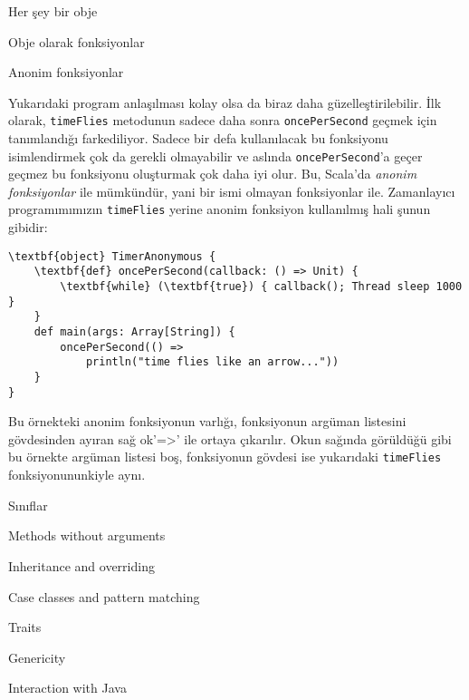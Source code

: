 \documentclass[10pt,a4paper]{book}
\begin{document}
\begin{chapter}{Her şey bir obje}
\begin{section}{Obje olarak fonksiyonlar}
\begin{subsection}{Anonim fonksiyonlar}

Yukarıdaki program anlaşılması kolay olsa da biraz daha güzelleştirilebilir. İlk olarak, \texttt{timeFlies} metodunun sadece daha sonra \texttt{oncePerSecond} geçmek için tanımlandığı farkediliyor. Sadece bir defa kullanılacak bu fonksiyonu isimlendirmek çok da gerekli olmayabilir ve aslında \texttt{oncePerSecond}'a geçer geçmez bu fonksiyonu oluşturmak çok daha iyi olur. Bu, Scala'da \textit{anonim fonksiyonlar} ile mümkündür, yani bir ismi olmayan fonksiyonlar ile. Zamanlayıcı programımımızın \texttt{timeFlies} yerine anonim fonksiyon kullanılmış hali şunun gibidir:

\begin{verbatim}
\textbf{object} TimerAnonymous {
	\textbf{def} oncePerSecond(callback: () => Unit) {
		\textbf{while} (\textbf{true}) { callback(); Thread sleep 1000 }
	}
	def main(args: Array[String]) {
		oncePerSecond(() =>
			println("time flies like an arrow..."))
	}
}
\end{verbatim}

Bu örnekteki anonim fonksiyonun varlığı, fonksiyonun argüman listesini gövdesinden ayıran sağ ok'=>' ile ortaya çıkarılır. Okun sağında görüldüğü gibi bu örnekte argüman listesi boş, fonksiyonun gövdesi ise yukarıdaki \texttt{timeFlies} fonksiyonununkiyle aynı.
\end{subsection}

\end{section}

\end{chapter}

\begin{chapter}{Sınıflar}

\begin{section}{Methods without arguments}

\end{section}

\begin{section}{Inheritance and overriding}

\end{section}

\end{chapter}

\begin{chapter}{Case classes and pattern matching}

\end{chapter}

\begin{chapter}{Traits}

\end{chapter}

\begin{chapter}{Genericity}

\end{chapter}

\begin{chapter}{Interaction with Java}

\end{chapter}
\end{document}
